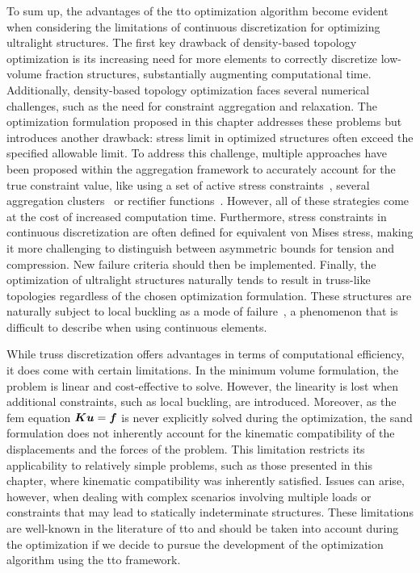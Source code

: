 To sum up, the advantages of the \gls{tto} optimization algorithm become evident when considering the limitations of continuous discretization for optimizing ultralight structures. The first key drawback of density-based topology optimization is its increasing need for more elements to correctly discretize low-volume fraction structures, substantially augmenting computational time. Additionally, density-based topology optimization faces several numerical challenges, such as the need for constraint aggregation and relaxation. The optimization formulation proposed in this chapter addresses these problems but introduces another drawback: stress limit in optimized structures often exceed the specified allowable limit. To address this challenge, multiple approaches have been proposed within the aggregation framework to accurately account for the true constraint value, like using a set of active stress constraints~, several aggregation clusters~ or rectifier functions~. However, all of these strategies come at the cost of increased computation time. Furthermore, stress constraints in continuous discretization are often defined for equivalent von Mises stress, making it more challenging to distinguish between asymmetric bounds for tension and compression. New failure criteria should then be implemented. Finally, the optimization of ultralight structures naturally tends to result in truss-like topologies regardless of the chosen optimization formulation. These structures are naturally subject to local buckling as a mode of failure~, a phenomenon that is difficult to describe when using continuous elements.

While truss discretization offers advantages in terms of computational efficiency, it does come with certain limitations. In the minimum volume formulation, the problem is linear and cost-effective to solve. However, the linearity is lost when additional constraints, such as local buckling, are introduced. Moreover, as the \gls{fem} equation $\bm{K}\bm{u}=\bm{f}$ is never explicitly solved during the optimization, the \gls{sand} formulation does not inherently account for the kinematic compatibility of the displacements and the forces of the problem. This limitation restricts its applicability to relatively simple problems, such as those presented in this chapter, where kinematic compatibility was inherently satisfied. Issues can arise, however, when dealing with complex scenarios involving multiple loads or constraints that may lead to statically indeterminate structures. These limitations are well-known in the literature of \gls{tto} and should be taken into account during the optimization if we decide to pursue the development of the optimization algorithm using the \gls{tto} framework.

